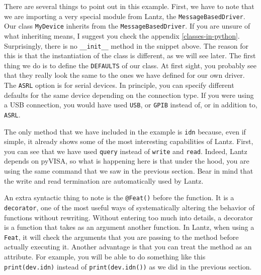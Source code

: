 There are several things to point out in this example. First, we have to
note that we are importing a very special module from Lantz, the
\texttt{MessageBasedDriver}. Our class \texttt{MyDevice} inherits from the
\texttt{MessageBasedDriver}. If you are unsure of what inheriting means,
I suggest you check the appendix \ref{classes-in-python}. Surprisingly, there is
no \texttt{__init__} method in the snippet above. The reason for this is that the instantiation of the class is different, as we will see later. The first thing we do is to
define the \texttt{DEFAULTS} of our class. At first sight, you probably
see that they really look the same to the ones we have defined for our own driver. The \texttt{ASRL} option is for serial devices. In principle, you can specify different defaults for the same device depending on the connection type. If you were using a {USB} connection, you would
have used \texttt{USB}, or \texttt{GPIB} instead of, or in
addition to, \texttt{ASRL}.

The only method that we have included in the example is \texttt{idn} because,
even if simple, it already shows some of the most interesting
capabilities of Lantz. First, you can see that we have used \texttt{query} instead
of \texttt{write} and \texttt{read}. Indeed, Lantz depends on pyVISA, so what is happening here is that under the hood, you are using the same command that we saw in the previous section. Bear in mind that the write and read termination are automatically used by Lantz. 

An extra syntactic thing to note is the \texttt{@Feat()} before the
function. It is a \texttt{decorator}, one of the most useful ways of
systematically altering the behavior of functions without rewriting.
Without entering too much into details, a decorator is a function that
takes as an argument another function. In Lantz, when using a
\texttt{Feat}, it will check the arguments that you are passing to the
method before actually executing it. Another advantage is that you can treat the method as an attribute. For example, you will be able to do something like this
\texttt{print(dev.idn)} instead of \texttt{print(dev.idn())} as we did
in the previous section.


